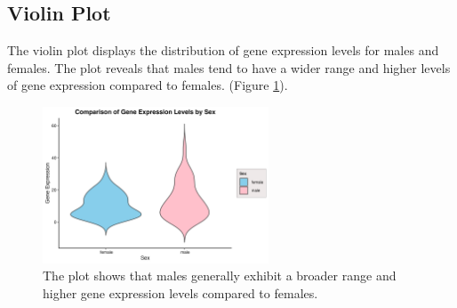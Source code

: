 \documentclass[12pt]{article}
\begin{document}
\subsection{Violin Plot}
The violin plot displays the distribution of gene expression levels for males and females. The plot reveals that males tend to have a wider range and higher levels of gene expression compared to females. (Figure \ref{final_violin_plot}).

\begin{figure}[H]
    \centering
    \includegraphics[width=0.6\textwidth, height=0.3\textheight]{final_violin_plot.png}
    \caption{The plot shows that males generally exhibit a broader range and higher gene expression levels compared to females.}
    \label{final_violin_plot}
\end{figure}

\newpage


\end{document}
